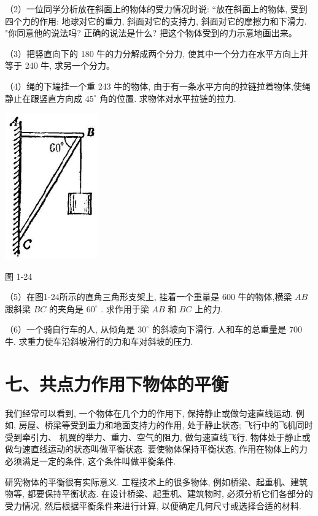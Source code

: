 \documentclass[10pt]{article}
\begin{document}
（2）一位同学分析放在斜面上的物体的受力情况时说: “放在斜面上的物体, 受到四个力的作用: 地球对它的重力, 斜面对它的支持力, 斜面对它的摩擦力和下滑力. "你同意他的说法吗? 正确的说法是什么? 把这个物体受到的力示意地画出来。

（3）把竖直向下的 180 牛的力分解成两个分力, 使其中一个分力在水平方向上并等于 240 牛, 求另一个分力。

（4）绳的下端挂一个重 243 牛的物体, 由于有一条水平方向的拉链拉着物体,使绳静止在跟竖直方向成 \({45}^{ \circ }\) 角的位置. 求物体对水平拉链的拉力.

\begin{center}
\includegraphics[max width=0.3\textwidth]{images/01912d55-147c-70aa-b0e0-1782a122f948_37_421617.jpg}
\end{center}

图 1-24

（5）在图1-24所示的直角三角形支架上, 挂着一个重量是 600 牛的物体,横梁 \({AB}\) 跟斜梁 \({BC}\) 的夹角是 \({60}^{ \circ }\) . 求作用于梁 \({AB}\) 和 \({BC}\) 上的力.

（6）一个骑自行车的人, 从倾角是 \({30}^{ \circ }\) 的斜坡向下滑行. 人和车的总重量是 700 牛. 求重力使车沿斜坡滑行的力和车对斜坡的压力.

\section*{七、共点力作用下物体的平衡}

我们经常可以看到, 一个物体在几个力的作用下, 保持静止或做匀速直线运动. 例如, 房屋、桥梁等受到重力和地面支持力的作用, 处于静止状态; 飞行中的飞机同时受到牵引力、 机翼的举力、重力、空气的阻力, 做匀速直线飞行. 物体处于静止或做匀速直线运动的状态叫做平衡状态. 要使物体保持平衡状态, 作用在物体上的力必须满足一定的条件, 这个条件叫做平衡条件.

研究物体的平衡很有实际意义. 工程技术上的很多物体, 例如桥梁、起重机、建筑物等, 都要保持平衡状态. 在设计桥梁、起重机、建筑物时, 必须分析它们各部分的受力情况, 然后根据平衡条件来进行计算, 以便确定几何尺寸或选择合适的材料.
\end{document}
